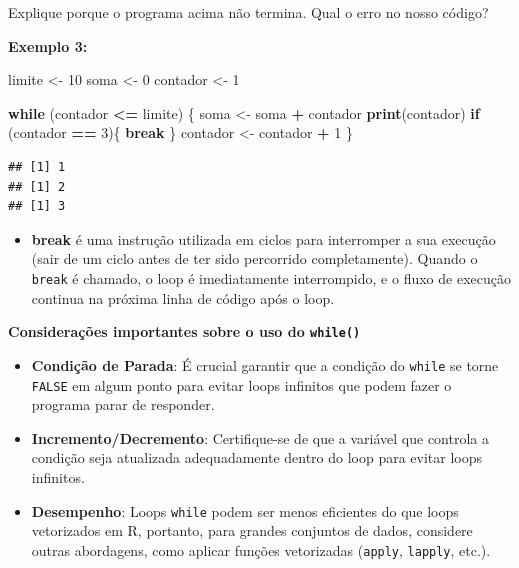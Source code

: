 \documentclass[
]{book}
\newenvironment{Shaded}{\begin{snugshade}}{\end{snugshade}}
\newcommand{\ControlFlowTok}[1]{\textcolor[rgb]{0.13,0.29,0.53}{\textbf{#1}}}
\newcommand{\DecValTok}[1]{\textcolor[rgb]{0.00,0.00,0.81}{#1}}
\newcommand{\FunctionTok}[1]{\textcolor[rgb]{0.13,0.29,0.53}{\textbf{#1}}}
\newcommand{\NormalTok}[1]{#1}
\newcommand{\OtherTok}[1]{\textcolor[rgb]{0.56,0.35,0.01}{#1}}
\newcommand{\SpecialCharTok}[1]{\textcolor[rgb]{0.81,0.36,0.00}{\textbf{#1}}}
\providecommand{\tightlist}{%
  \setlength{\itemsep}{0pt}\setlength{\parskip}{0pt}}
\theoremstyle{definition}
\theoremstyle{definition}
\theoremstyle{definition}
\theoremstyle{definition}
\theoremstyle{remark}
\begin{document}
Explique porque o programa acima não termina. Qual o erro no nosso código?

\textbf{Exemplo 3:}

\begin{Shaded}
\begin{Highlighting}[]
\NormalTok{limite }\OtherTok{\textless{}{-}} \DecValTok{10}
\NormalTok{soma }\OtherTok{\textless{}{-}} \DecValTok{0}
\NormalTok{contador }\OtherTok{\textless{}{-}} \DecValTok{1}

\ControlFlowTok{while}\NormalTok{ (contador }\SpecialCharTok{\textless{}=}\NormalTok{ limite) \{  }
\NormalTok{  soma }\OtherTok{\textless{}{-}}\NormalTok{ soma }\SpecialCharTok{+}\NormalTok{ contador  }
  \FunctionTok{print}\NormalTok{(contador)  }
  \ControlFlowTok{if}\NormalTok{ (contador }\SpecialCharTok{==} \DecValTok{3}\NormalTok{)\{    }
    \ControlFlowTok{break}  
\NormalTok{  \}  }
\NormalTok{  contador }\OtherTok{\textless{}{-}}\NormalTok{ contador }\SpecialCharTok{+} \DecValTok{1}
\NormalTok{\}}
\end{Highlighting}
\end{Shaded}

\begin{verbatim}
## [1] 1
## [1] 2
## [1] 3
\end{verbatim}

\begin{itemize}
\tightlist
\item
  \textbf{break} é uma instrução utilizada em ciclos para interromper a sua execução (sair de um ciclo antes de ter sido percorrido completamente). Quando o \texttt{break} é chamado, o loop é imediatamente interrompido, e o fluxo de execução continua na próxima linha de código após o loop.
\end{itemize}

\textbf{Considerações importantes sobre o uso do \texttt{while()}}

\begin{itemize}
\item
  \textbf{Condição de Parada}: É crucial garantir que a condição do \texttt{while} se torne \texttt{FALSE} em algum ponto para evitar loops infinitos que podem fazer o programa parar de responder.
\item
  \textbf{Incremento/Decremento}: Certifique-se de que a variável que controla a condição seja atualizada adequadamente dentro do loop para evitar loops infinitos.
\item
  \textbf{Desempenho}: Loops \texttt{while} podem ser menos eficientes do que loops vetorizados em R, portanto, para grandes conjuntos de dados, considere outras abordagens, como aplicar funções vetorizadas (\texttt{apply}, \texttt{lapply}, etc.).
\end{itemize}
\end{document}
